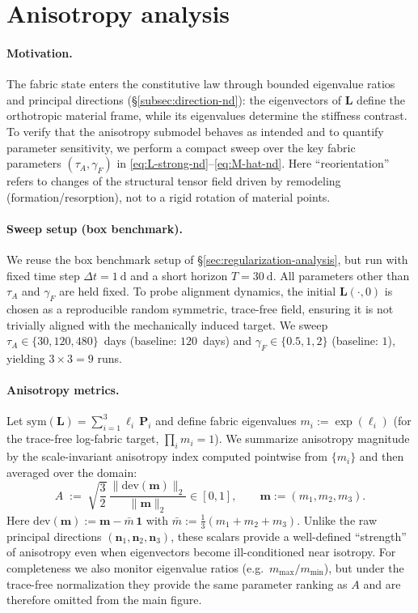 \section*{Anisotropy analysis}
\label{sec:anisotropy-analysis}

\paragraph{Motivation.}
The fabric state enters the constitutive law through bounded eigenvalue ratios and principal directions (\S\ref{subsec:direction-nd}): the eigenvectors of $\mathbf{L}$ define the orthotropic material frame, while its eigenvalues determine the stiffness contrast.
To verify that the anisotropy submodel behaves as intended and to quantify parameter sensitivity, we perform a compact sweep over the key fabric parameters $(\tau_A,\gamma_F)$ in \eqref{eq:L-strong-nd}--\eqref{eq:M-hat-nd}.
Here ``reorientation'' refers to changes of the structural tensor field driven by remodeling (formation/resorption), not to a rigid rotation of material points.

\paragraph{Sweep setup (box benchmark).}
We reuse the box benchmark setup of \S\ref{sec:regularization-analysis}, but run with fixed time step $\Delta t=1~\mathrm{d}$ and a short horizon $T=30~\mathrm{d}$.
All parameters other than $\tau_A$ and $\gamma_F$ are held fixed.
To probe alignment dynamics, the initial $\mathbf{L}(\cdot,0)$ is chosen as a reproducible random symmetric, trace-free field, ensuring it is not trivially aligned with the mechanically induced target.
We sweep $\tau_A\in\{30,120,480\}$~days (baseline: $120$~days) and $\gamma_F\in\{0.5,1,2\}$ (baseline: $1$), yielding $3\times 3=9$ runs.

\paragraph{Anisotropy metrics.}
Let $\mathrm{sym}(\mathbf{L})=\sum_{i=1}^3 \ell_i\,\mathbf{P}_i$ and define fabric eigenvalues $m_i:=\exp(\ell_i)$ (for the trace-free log-fabric target, $\prod_i m_i=1$).
We summarize anisotropy magnitude by the scale-invariant anisotropy index computed pointwise from $\{m_i\}$ and then averaged over the domain:
\[
A \;:=\; \sqrt{\frac{3}{2}}\,\frac{\|\mathrm{dev}(\mathbf{m})\|_2}{\|\mathbf{m}\|_2}\in[0,1],
\qquad
\mathbf{m}:=(m_1,m_2,m_3).
\]
Here $\mathrm{dev}(\mathbf{m}):=\mathbf{m}-\bar m\,\mathbf{1}$ with $\bar m:=\tfrac13(m_1+m_2+m_3)$.
Unlike the raw principal directions $(\mathbf{n}_1,\mathbf{n}_2,\mathbf{n}_3)$, these scalars provide a well-defined ``strength'' of anisotropy even when eigenvectors become ill-conditioned near isotropy.
For completeness we also monitor eigenvalue ratios (e.g.\ $m_{\max}/m_{\min}$), but under the trace-free normalization they provide the same parameter ranking as $A$ and are therefore omitted from the main figure.

